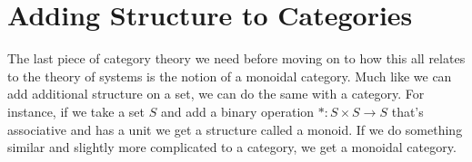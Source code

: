 \documentclass[12pt]{article}
\begin{document}
\section*{Adding Structure to Categories}
The last piece of category theory we need before moving on to how this all relates to the theory of systems is the notion of a monoidal category.
Much like we can add additional structure on a set, we can do the same with a category.
For instance, if we take a set $S$ and add a binary operation $*:S \times S \rightarrow S$ that's associative and has a unit we get a structure called a monoid.
If we do something similar and slightly more complicated to a category, we get a monoidal category.
\end{document}

